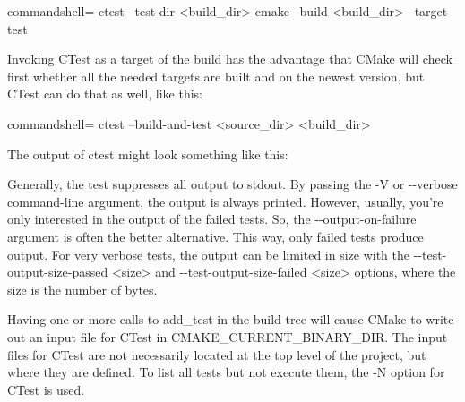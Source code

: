 \begin{tcblisting}{commandshell={}}
ctest --test-dir <build_dir>
cmake --build <build_dir> --target test
\end{tcblisting}

Invoking CTest as a target of the build has the advantage that CMake will check first whether all the needed targets are built and on the newest version, but CTest can do that as well, like this:

\begin{tcblisting}{commandshell={}}
ctest --build-and-test <source_dir> <build_dir>
\end{tcblisting}

The output of ctest might look something like this:


Generally, the test suppresses all output to stdout. By passing the -V or -{}-verbose command-line argument, the output is always printed. However, usually, you're only interested in the output of the failed tests. So, the -{}-output-on-failure argument is often the better alternative. This way, only failed tests produce output. For very verbose tests, the output can be limited in size with the -{}-test-output-size-passed <size> and -{}-test-output-size-failed <size> options, where the size is the number of bytes.

Having one or more calls to add\_test in the build tree will cause CMake to write out an input file for CTest in CMAKE\_CURRENT\_BINARY\_DIR. The input files for CTest are not necessarily located at the top level of the project, but where they are defined. To list all tests but not execute them, the -N option for CTest is used.

